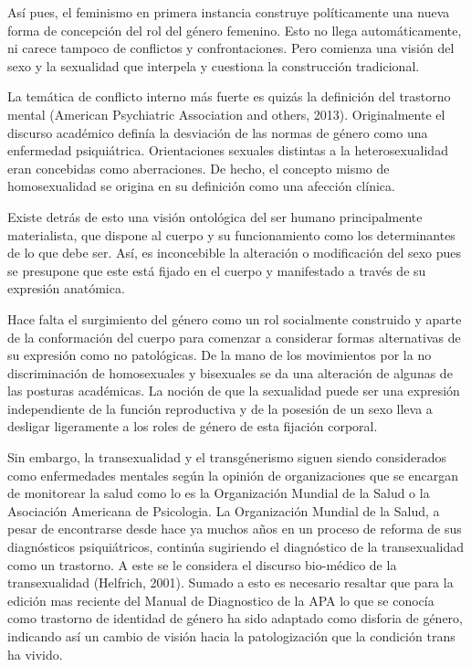 Así pues, el feminismo en primera instancia construye políticamente una nueva
forma de concepción del rol del género femenino.
Esto no llega automáticamente, ni carece tampoco de conflictos y
confrontaciones.
Pero comienza una visión del sexo y la sexualidad que interpela y cuestiona la
construcción tradicional.

La temática de conflicto interno más fuerte es quizás la definición del
trastorno mental (American Psychiatric Association and others, 2013).
Originalmente el discurso académico definía la desviación de las normas de
género como una enfermedad psiquiátrica.
Orientaciones sexuales distintas a la heterosexualidad eran concebidas como
aberraciones.
De hecho, el concepto mismo de homosexualidad se origina en su definición como
una afección clínica.

Existe detrás de esto una visión ontológica del ser humano principalmente
materialista, que dispone al cuerpo y su funcionamiento como los determinantes
de lo que debe ser.
Así, es inconcebible la alteración o modificación del sexo pues se presupone que
este está fijado en el cuerpo y manifestado a través de su expresión anatómica.

Hace falta el surgimiento del género como un rol socialmente construido y aparte
de la conformación del cuerpo para comenzar a considerar formas alternativas de
su expresión como no patológicas.
De la mano de los movimientos por la no discriminación de homosexuales y
bisexuales se da una alteración de algunas de las posturas académicas.
La noción de que la sexualidad puede ser una expresión independiente de la
función reproductiva y de la posesión de un sexo lleva a desligar ligeramente a
los roles de género de esta fijación corporal.

Sin embargo, la transexualidad y el transgénerismo siguen siendo considerados
como enfermedades mentales según la opinión de organizaciones que se encargan de
monitorear la salud como lo es la Organización Mundial de la Salud o la
Asociación Americana de Psicologia.
La Organización Mundial de la Salud, a pesar de encontrarse desde hace ya muchos
años en un proceso de reforma de sus diagnósticos psiquiátricos, continúa
sugiriendo el diagnóstico de la transexualidad como un trastorno.
A este se le considera el discurso bio-médico de la transexualidad (Helfrich,
2001).
Sumado a esto es necesario resaltar que para la edición mas reciente del Manual
de Diagnostico de la APA lo que se conocía como trastorno de identidad de género
ha sido adaptado como disforia de género, indicando así un cambio de visión
hacia la patologización que la condición trans ha vivido.

